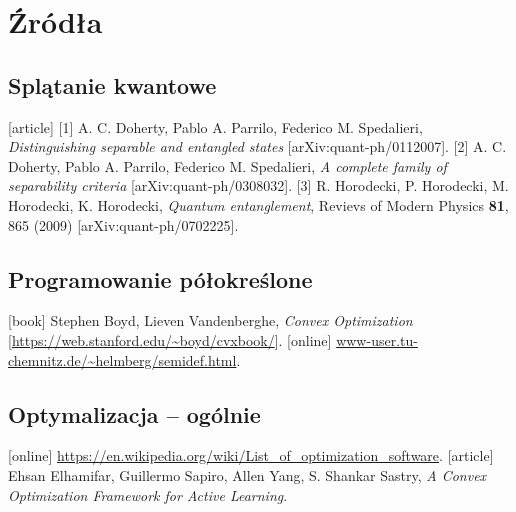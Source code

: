 \documentclass{beamer}
\begin{document}
\section{Źródła}

\subsection{Splątanie kwantowe}

\begin{frame}
    \begin{thebibliography}{1cm}
        [article]
        [1] A. C. Doherty, Pablo A. Parrilo, Federico M. Spedalieri, \textit{Distinguishing separable and entangled states} [arXiv:quant-ph/0112007].
        [2] A. C. Doherty, Pablo A. Parrilo, Federico M. Spedalieri, \textit{A complete family of separability criteria} [arXiv:quant-ph/0308032].
        [3] R. Horodecki, P. Horodecki, M. Horodecki, K. Horodecki, \textit{Quantum entanglement}, Revievs of Modern Physics \textbf{81}, 865 (2009) [arXiv:quant-ph/0702225].
    \end{thebibliography}
\end{frame}

\subsection{Programowanie półokreślone}

\begin{frame}
    \begin{thebibliography}{1cm}
        [book]
        \bibitem{} Stephen Boyd, Lieven Vandenberghe, \textit{Convex Optimization} [\url{https://web.stanford.edu/~boyd/cvxbook/}].
        [online]
         \url{www-user.tu-chemnitz.de/~helmberg/semidef.html}.
    \end{thebibliography}
\end{frame}

\subsection{Optymalizacja -- ogólnie}

\begin{frame}
    \begin{thebibliography}{1cm}
        [online]
        \bibitem{} \url{https://en.wikipedia.org/wiki/List_of_optimization_software}.
        [article]
        \bibitem{} Ehsan Elhamifar, Guillermo Sapiro, Allen Yang, S. Shankar Sastry, \textit{A Convex Optimization Framework for Active Learning}.
    \end{thebibliography}
\end{frame}
\end{document}

